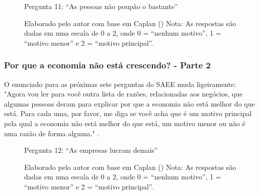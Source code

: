 \begin{figure}[H]
    \centering
    \caption*{Pergunta 11: “As pessoas não poupão o bastante”}
    \caption{Elaborado pelo autor com base em Caplan (\citeyear{The_Myth_of_the_Rational_Voter}) \newline
    Nota: As respostas são dadas em uma escala de 0 a 2, onde 0 = “nenhum motivo”, 1 = “motivo menor” e 2 = “motivo principal”.}
    \label{fig:pergunta_11}
\end{figure}

\subsubsection{Por que a economia não está crescendo? - Parte 2}

O enunciado para as próximas sete perguntas do SAEE muda ligeiramente: "Agora vou ler para você outra lista de razões, relacionadas aos negócios, que algumas pessoas deram para explicar por que a economia não está melhor do que está. Para cada uma, por favor, me diga se você acha que é um motivo principal pela qual a economia não está melhor do que está, um motivo menor ou não é uma razão de forma alguma." \cite{saee1996}.

\begin{figure}[H]
    \centering
    \caption*{Pergunta 12: “As empresas lucram demais”}
    \caption{Elaborado pelo autor com base em Caplan (\citeyear{The_Myth_of_the_Rational_Voter}) \newline
    Nota: As respostas são dadas em uma escala de 0 a 2, onde 0 = “nenhum motivo”, 1 = “motivo menor” e 2 = “motivo principal”.}
    \label{fig:pergunta_12}
\end{figure}


